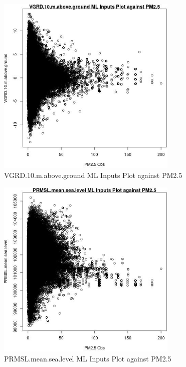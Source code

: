 \begin{figure} 
\centering  
\includegraphics[width=0.77\textwidth]{Code_Outputs/ML_input_report_ML_input_PM25_Step5_part_d_de_duplicated_aves_ML_input_VGRD10mabovegroundvPM25_Obs.jpg} 
\caption{\label{fig:ML_input_report_ML_input_PM25_Step5_part_d_de_duplicated_aves_ML_inputVGRD10mabovegroundvPM25_Obs}VGRD.10.m.above.ground ML Inputs Plot against PM2.5} 
\end{figure} 
 

\begin{figure} 
\centering  
\includegraphics[width=0.77\textwidth]{Code_Outputs/ML_input_report_ML_input_PM25_Step5_part_d_de_duplicated_aves_ML_input_PRMSLmeansealevelvPM25_Obs.jpg} 
\caption{\label{fig:ML_input_report_ML_input_PM25_Step5_part_d_de_duplicated_aves_ML_inputPRMSLmeansealevelvPM25_Obs}PRMSL.mean.sea.level ML Inputs Plot against PM2.5} 
\end{figure} 
 


